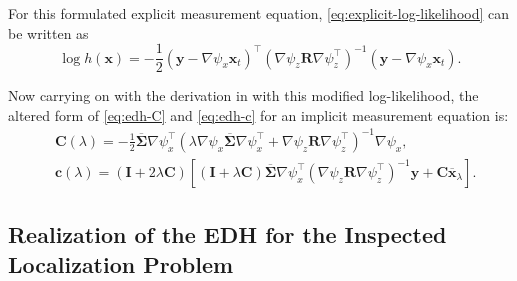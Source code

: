 For this formulated explicit measurement equation, \eqref{eq:explicit-log-likelihood} can be written as
\begin{equation}
    \log h(\mathbf{x}) =-\frac{1}{2}(\mathbf{y}-\nabla \psi_x \mathbf{x}_t)^{\top} (\nabla \psi_z\mathbf{R}\nabla \psi_z^{\top})^{-1}(\mathbf{y}-\nabla \psi_x \mathbf{x}_t).
\end{equation}

Now carrying on with the derivation in \cite{Khan2018} with this modified log-likelihood,
the altered form of \eqref{eq:edh-C} and \eqref{eq:edh-c} for an implicit measurement
equation is:
\begin{align}
     & \mathbf{C}(\lambda) = -\frac{1}{2}\mathbf{\mathbf{\overline\Sigma}}\nabla \psi_x^\top\left(\lambda \nabla \psi_x\mathbf{\overline\Sigma}\nabla \psi_x^\top + \nabla \psi_z\mathbf{R}\nabla \psi_z^{\top}\right)^{-1}\nabla \psi_x,  \label{eq:edh-C-impl}                                     \\
     & \mathbf{c}(\lambda) = \left(\mathbf{I}+2\lambda\mathbf{C}\right)\left[\left(\mathbf{I}+\lambda\mathbf{C}\right)\mathbf{\overline\Sigma}\nabla \psi_x^\top(\nabla \psi_z\mathbf{R}\nabla \psi_z^{\top})^{-1}\mathbf{y} + \mathbf{C}\overline{\mathbf{x}}_\lambda\right]. \label{eq:edh-c-impl}
\end{align}
\subsection{Realization of the EDH for the Inspected Localization Problem}

